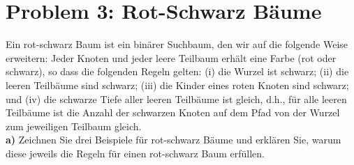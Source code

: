 \section*{Problem 3: Rot-Schwarz Bäume} 

Ein rot-schwarz Baum ist ein binärer Suchbaum, den wir auf die folgende Weise erweitern: Jeder Knoten und jeder leere Teilbaum erhält eine Farbe (rot oder schwarz), so dass die folgenden Regeln gelten: (i) die Wurzel ist schwarz; (ii) die leeren Teilbäume sind schwarz; (iii) die Kinder eines roten Knoten sind schwarz; und (iv) die schwarze Tiefe aller leeren Teilbäume ist gleich, d.h., für alle leeren Teilbäume ist die Anzahl der schwarzen Knoten auf dem Pfad von der Wurzel zum jeweiligen Teilbaum gleich.\\

\noindent
\textbf{a)} Zeichnen Sie drei Beispiele für rot-schwarz Bäume und erklären Sie, warum diese jeweils die Regeln für einen rot-schwarz Baum erfüllen. 


